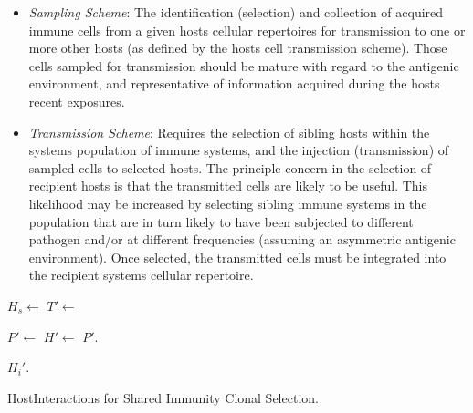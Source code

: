 \begin{itemize}
	\item \emph{Sampling Scheme}: The identification (selection) and collection of acquired immune cells from a given hosts cellular repertoires for transmission to one or more other hosts (as defined by the hosts cell transmission scheme). Those cells sampled for transmission should be mature with regard to the antigenic environment, and representative of information acquired during the hosts recent exposures. 
	\item \emph{Transmission Scheme}: Requires the selection of sibling hosts within the systems population of immune systems, and the injection (transmission) of sampled cells to selected hosts. The principle concern in the selection of recipient hosts is that the transmitted cells are likely to be useful. This likelihood may be increased by selecting sibling immune systems in the population that are in turn likely to have been subjected to different pathogen and/or at different frequencies (assuming an asymmetric antigenic environment). Once selected, the transmitted cells must be integrated into the recipient systems cellular repertoire.
\end{itemize}

\begin{algorithm}[ht]
  \SetLine
  
  
	{
		$H_{s} \leftarrow$ \RandomHost{\Pop}\;
		$T\prime \leftarrow$ \; 
		
		$P\prime \leftarrow$ \Pop\;
		{
			$H\prime \leftarrow$ \;
			$P\prime$.\;
		}
		
		{
			$H_{i}\prime$.\;
		}
	}  
	\caption{HostInteractions for Shared Immunity Clonal Selection.}
	\label{alg:hosts:algorithms:sihcsa}
\end{algorithm}

